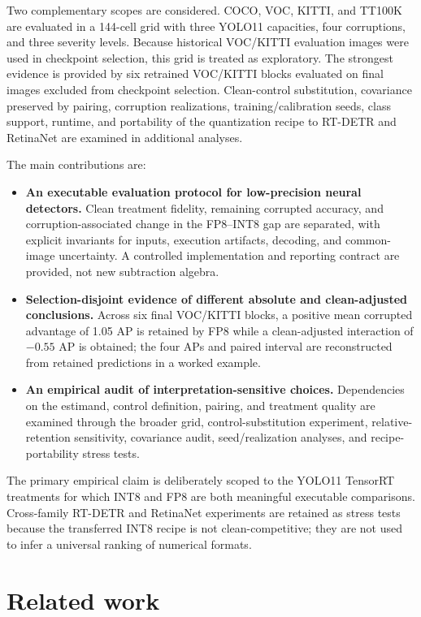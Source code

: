 \documentclass[a4paper,fleqn]{cas-dc}
\begin{document}
Two complementary scopes are considered. COCO, VOC, KITTI, and TT100K are evaluated in a 144-cell grid with three YOLO11 capacities, four corruptions, and three severity levels. Because historical VOC/KITTI evaluation images were used in checkpoint selection, this grid is treated as exploratory. The strongest evidence is provided by six retrained VOC/KITTI blocks evaluated on final images excluded from checkpoint selection. Clean-control substitution, covariance preserved by pairing, corruption realizations, training/calibration seeds, class support, runtime, and portability of the quantization recipe to RT-DETR and RetinaNet are examined in additional analyses.

The main contributions are:
\begin{itemize}[leftmargin=1.45em,itemsep=2pt,topsep=3pt,parsep=0pt]
\item \textbf{An executable evaluation protocol for low-precision neural detectors.} Clean treatment fidelity, remaining corrupted accuracy, and corruption-associated change in the FP8--INT8 gap are separated, with explicit invariants for inputs, execution artifacts, decoding, and common-image uncertainty. A controlled implementation and reporting contract are provided, not new subtraction algebra.
\item \textbf{Selection-disjoint evidence of different absolute and clean-adjusted conclusions.} Across six final VOC/KITTI blocks, a positive mean corrupted advantage of 1.05 AP is retained by FP8 while a clean-adjusted interaction of $-0.55$ AP is obtained; the four APs and paired interval are reconstructed from retained predictions in a worked example.
\item \textbf{An empirical audit of interpretation-sensitive choices.} Dependencies on the estimand, control definition, pairing, and treatment quality are examined through the broader grid, control-substitution experiment, relative-retention sensitivity, covariance audit, seed/realization analyses, and recipe-portability stress tests.
\end{itemize}

The primary empirical claim is deliberately scoped to the YOLO11 TensorRT treatments for which INT8 and FP8 are both meaningful executable comparisons. Cross-family RT-DETR and RetinaNet experiments are retained as stress tests because the transferred INT8 recipe is not clean-competitive; they are not used to infer a universal ranking of numerical formats.

\section{Related work}
\label{sec:related-work}
\end{document}
